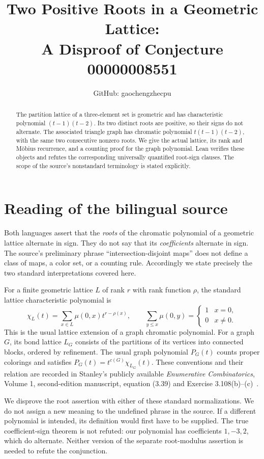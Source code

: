 \documentclass[11pt]{article}
\title{Two Positive Roots in a Geometric Lattice:\\A Disproof of Conjecture 00000008551}
\author{GitHub: gaochengzhecpu}
\date{}
\begin{document}
\maketitle
\begin{abstract}
The partition lattice of a three-element set is geometric and has
characteristic polynomial \mbox{$(t-1)(t-2)$}. Its two distinct roots are positive, so their
signs do not alternate. The associated triangle graph has chromatic
polynomial $t(t-1)(t-2)$, with the same two consecutive nonzero roots.
We give the actual lattice, its rank and M\"obius recurrence, and a
counting proof for the graph polynomial. Lean verifies these objects
and refutes the corresponding universally quantified root-sign clauses.
The scope of the source's nonstandard terminology is stated explicitly.
\end{abstract}

\section*{Reading of the bilingual source}
Both languages assert that the \emph{roots} of the chromatic polynomial
of a geometric lattice alternate in sign. They do not say that its
\emph{coefficients} alternate in sign. The source's preliminary phrase
``intersection-disjoint maps'' does not define a class of maps, a color
set, or a counting rule. Accordingly we state precisely the two standard
interpretations covered here.

For a finite geometric lattice $L$ of rank $r$ with rank function $\rho$,
the standard lattice characteristic polynomial is
\[
 \chi_L(t)=\sum_{x\in L}\mu(0,x)t^{r-\rho(x)},
 \qquad
 \sum_{y\leq x}\mu(0,y)=
 \begin{cases}1&x=0,\\0&x\ne0.\end{cases}
\]
This is the usual lattice extension of a graph chromatic polynomial.
For a graph $G$, its bond lattice $L_G$ consists of the partitions of
its vertices into connected blocks, ordered by refinement. The usual
graph polynomial $P_G(t)$ counts proper colorings and satisfies
$P_G(t)=t^{c(G)}\chi_{L_G}(t)$. These conventions and their relation
are recorded in Stanley's publicly available \emph{Enumerative
Combinatorics}, Volume 1, second-edition manuscript, equation (3.39)
and Exercise 3.108(b)--(c)~\cite{stanley}.

We disprove the root assertion with either of these standard
normalizations. We do not assign a new meaning to the undefined phrase
in the source. If a different polynomial is intended, its definition
would first have to be supplied. The true coefficient-sign theorem is
not refuted: our polynomial has coefficients $1,-3,2$, which do
alternate. Neither version of the separate root-modulus assertion is
needed to refute the conjunction.
\end{document}
